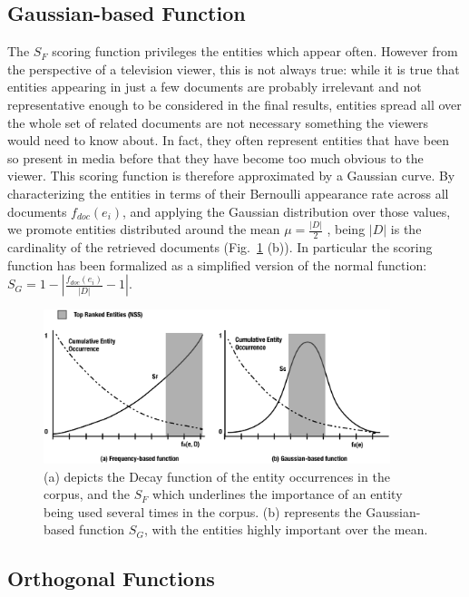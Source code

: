 \documentclass{llncs}
\begin{document}
\subsection{Gaussian-based Function}
The $S_F$ scoring function privileges the entities which appear often. However from the perspective of a television viewer, this is not always true: while it is true that entities appearing in just a few documents are probably irrelevant and not representative enough to be considered in the final results, entities spread all over the whole set of related documents are not necessary something the viewers would need to know about. In fact, they often represent entities that have been so present in media before that they have become too much obvious to the viewer. This scoring function is therefore approximated by a Gaussian curve.
By characterizing the entities in terms of their Bernoulli appearance rate across all documents $f_{doc}(e_i)$, and applying the Gaussian distribution over those values, we  promote entities distributed around the mean $\mu = \frac{|D|}{2}$ , being $|D|$ is the cardinality of the retrieved documents (Fig.~\ref{fig:rankingStrategies} (b)). In particular the scoring function has been formalized as a simplified version of the normal function: $S_G = 1-\left | \frac{ f_{doc}(e_i) }{|D|} -1 \right |$.
\begin{figure}[h!]
\centering
\includegraphics[width=0.9\textwidth]{figure/RankingStrategies}
\caption{(a) depicts the Decay function of the entity occurrences in the corpus, and the $S_F$ which underlines the importance of an entity being used several times in the corpus. (b) represents the Gaussian-based function $S_G$, with the entities highly important over the mean.}
\label{fig:rankingStrategies}%
\end{figure}


\subsection{Orthogonal Functions}
\end{document}
